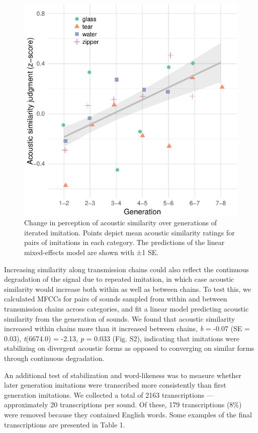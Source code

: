 \documentclass[english,floatsintext,man]{apa6}
\theoremstyle{definition}
\theoremstyle{definition}
\theoremstyle{definition}
\theoremstyle{remark}
\begin{document}
\begin{figure}
\centering
\includegraphics{fig2-1.pdf}
\caption{\label{fig:fig2}Change in perception of acoustic similarity over
generations of iterated imitation. Points depict mean acoustic
similarity ratings for pairs of imitations in each category. The
predictions of the linear mixed-effects model are shown with ±1 SE.}
\end{figure}

Increasing similarity along transmission chains could also reflect the
continuous degradation of the signal due to repeated imitation, in which
case acoustic similarity would increase both within as well as between
chains. To test this, we calculated MFCCs for pairs of sounds sampled
from within and between transmission chains across categories, and fit a
linear model predicting acoustic similarity from the generation of
sounds. We found that acoustic similarity increased within chains more
than it increased between chains, \emph{b} = -0.07 (SE = 0.03),
\emph{t}(6674.0) = -2.13, \emph{p} = 0.033 (Fig. S2), indicating that
imitations were stabilizing on divergent acoustic forms as opposed to
converging on similar forms through continuous degradation.

An additional test of stabilization and word-likeness was to measure
whether later generation imitations were transcribed more consistently
than first generation imitations. We collected a total of 2163
transcriptions --- approximately 20 transcriptions per sound. Of these,
179 transcriptions (8\%) were removed because they contained English
words. Some examples of the final transcriptions are presented in Table
1.
\end{document}
